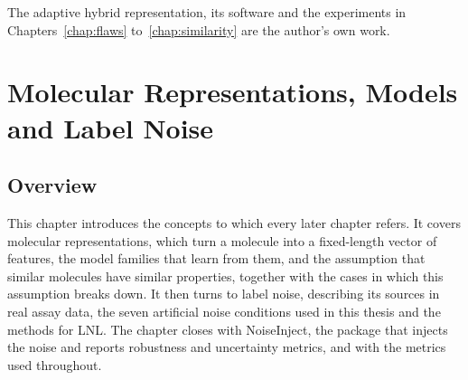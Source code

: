 The adaptive hybrid representation, its software and the experiments in Chapters~\ref{chap:flaws} to~\ref{chap:similarity} are the author's own work.



\pagebreak
\chapter{Molecular Representations, Models and Label Noise}\label{chap:background}\label{sec2}

\section{Overview}

This chapter introduces the concepts to which every later chapter refers. It covers molecular representations, which turn a molecule into a fixed-length vector of features, the model families that learn from them, and the assumption that similar molecules have similar properties, together with the cases in which this assumption breaks down. It then turns to label noise, describing its sources in real assay data, the seven artificial noise conditions used in this thesis and the methods for LNL. The chapter closes with NoiseInject, the package that injects the noise and reports robustness and uncertainty metrics, and with the metrics used throughout.




